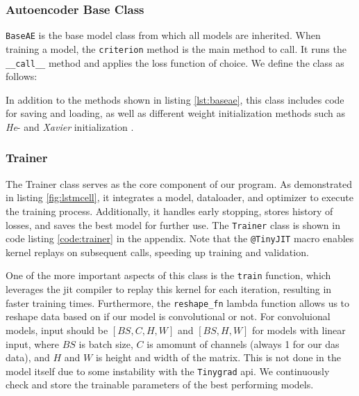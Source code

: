 \subsubsection{Autoencoder Base Class}

\lstinline{BaseAE} is the base model class from which all models are inherited. When training a model, the \lstinline{criterion} method is the main method to call. It runs the \lstinline{__call__} method and applies the loss function of choice. We define the class as follows:



In addition to the methods shown in listing \ref{lst:baseae}, this class includes code for saving and loading, as well as different weight initialization methods such as \textit{He}- and \textit{Xavier} initialization \cite{kumar2017weight}.

\subsubsection{Trainer}

The Trainer class serves as the core component of our program. As demonstrated in listing \ref{fig:lstmcell}, it integrates a model, dataloader, and optimizer to execute the training process. Additionally, it handles early stopping, stores history of losses, and saves the best model for further use. The \texttt{Trainer} class is shown in code listing \ref{code:trainer} in the appendix. Note that the \texttt{@TinyJIT} macro enables kernel replays on subsequent calls, speeding up training and validation. 



One of the more important aspects of this class is the \texttt{train} function, which leverages the \acrshort{jit} compiler to replay this kernel for each iteration, resulting in faster training times. Furthermore, the \texttt{reshape\_fn} lambda function allows us to reshape data based on if our model is convolutional or not. For convoluional models, input should be $[BS, C, H, W]$ and $[BS, H, W]$ for models with linear input, where $BS$ is batch size, $C$ is amomunt of channels (always 1 for our \acrshort{das} data), and $H$ and $W$ is height and width of the matrix. This is not done in the model itself due to some instability with the \texttt{Tinygrad} \acrshort{api}. We continuously check and store the trainable parameters of the best performing models.



